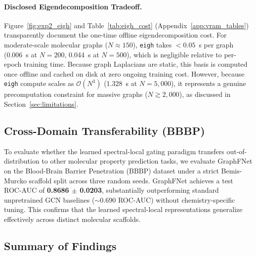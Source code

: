 \documentclass[10pt]{article}
\begin{document}
\paragraph{Disclosed Eigendecomposition Tradeoff.} Figure~\ref{fig:exp2_eigh} and Table~\ref{tab:eigh_cost} (Appendix~\ref{app:vram_tables}) transparently document the one-time offline eigendecomposition cost. For moderate-scale molecular graphs ($N \approx 150$), \texttt{eigh} takes $<0.05$~s per graph (0.006~s at $N=200$, 0.044~s at $N=500$), which is negligible relative to per-epoch training time. Because graph Laplacians are static, this basis is computed once offline and cached on disk at zero ongoing training cost. However, because \texttt{eigh} compute scales as $\mathcal{O}(N^3)$ (1.328~s at $N=5,000$), it represents a genuine precomputation constraint for massive graphs ($N \gtrsim 2{,}000$), as discussed in Section~\ref{sec:limitations}.

\subsection{Cross-Domain Transferability (BBBP)}

To evaluate whether the learned spectral-local gating paradigm transfers out-of-distribution to other molecular property prediction tasks, we evaluate GraphFNet on the Blood-Brain Barrier Penetration (BBBP) dataset \citep{wu2018moleculenet} under a strict Bemis-Murcko scaffold split across three random seeds. GraphFNet achieves a test ROC-AUC of \textbf{0.8686 $\pm$ 0.0203}, substantially outperforming standard unpretrained GCN baselines ($\sim$0.690 ROC-AUC) without chemistry-specific tuning. This confirms that the learned spectral-local representations generalize effectively across distinct molecular scaffolds.

\subsection{Summary of Findings}
\end{document}
